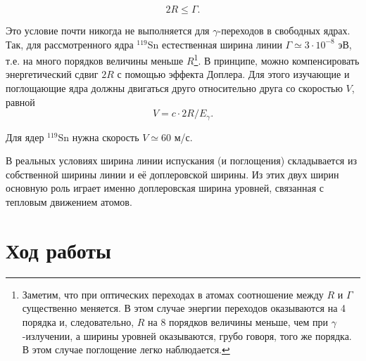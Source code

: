 \documentclass[a4paper, 12pt]{article}
\begin{document}
	\begin{equation}
		2R\leqslant\Gamma.
	\end{equation}
	\par
	Это условие почти никогда не выполняется для $\gamma$-переходов в свободных ядрах. Так, для рассмотренного ядра $^{119}$Sn естественная ширина линии $\Gamma\simeq3\cdot10^{-8}$ эВ, т.е. на много порядков величины меньше $R$\footnote{Заметим, что при оптических переходах в атомах соотношение между $R$ и $\Gamma$ существенно меняется. В этом случае энергии переходов оказываются на 4 порядка и, следовательно, $R$ на 8 порядков величины меньше, чем при $\gamma$-излучении, а ширины уровней оказываются, грубо говоря, того же порядка. В этом случае поглощение легко наблюдается.}. В принципе, можно компенсировать энергетический сдвиг $2R$ с помощью эффекта Доплера. Для этого изучающие и поглощающие ядра должны двигаться друго относительно друга со скоростью $V$, равной
	\begin{equation}
		V=c\cdot2R/E_\gamma.
	\end{equation}
	\par
	Для ядер $^{119}$Sn нужна скорость $V\simeq60$ м/с.\par
	В реальных условиях ширина линии испускания (и поглощения) складывается из собственной ширины линии и её доплеровской ширины. Из этих двух ширин основную роль играет именно доплеровская ширина уровней, связанная с тепловым движением атомов.
	\section{Ход работы}
\end{document}
